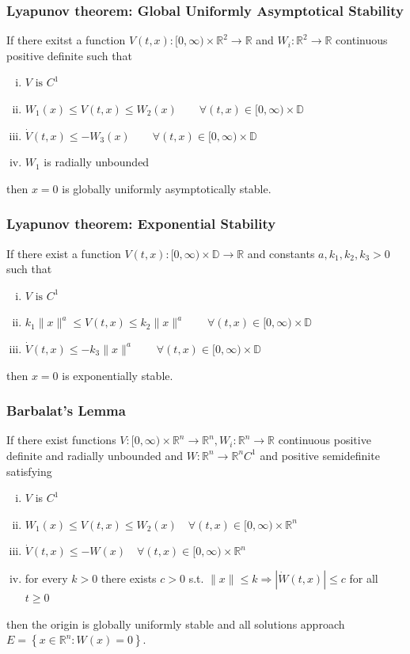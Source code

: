 \documentclass{article}
\newcommand{\mathbbR}{\mathbb{R}}
\begin{document}
\subsubsection{Lyapunov theorem: Global Uniformly Asymptotical Stability}
If there exitst a function $V(t,x):[0, \infty) \times \mathbb{R}^2 \rightarrow
	\mathbbR$ and $W_i: \mathbb{R}^2 \rightarrow \mathbb{R}$ continuous positive
definite such that
\begin{enumerate}[i)]
	\item $V \text{ is } C^1$
	\item $W_1(x) \leq V(t,x) \leq W_2(x) \qquad \forall (t,x) \in [0, \infty) \times \mathbb{D}$
	\item $\dot V(t,x) \leq -W_3(x) \qquad \forall (t,x) \in [0, \infty) \times \mathbb{D}$
	\item $W_1$ is radially unbounded
\end{enumerate}
then $x=0$ is globally uniformly asymptotically stable.
\subsubsection{Lyapunov theorem: Exponential Stability}
If there exist a function $V(t,x):[0, \infty) \times \mathbb{D} \rightarrow
	\mathbbR$ and constants $a, k_1, k_2, k_3 > 0$ such that
\begin{enumerate}[i)]
	\item $V \text{ is } C^1$
	\item $k_1 \|x\|^a \leq V(t,x) \leq k_2 \|x\|^a \qquad \forall (t,x) \in [0, \infty) \times \mathbb{D}$
	\item $\dot V(t,x) \leq -k_3 \|x\|^a \qquad \forall (t,x) \in [0, \infty) \times \mathbb{D}$
\end{enumerate}
then $x=0$ is exponentially stable.
\subsubsection{Barbalat's Lemma}
If there exist functions $V:[0, \infty) \times \mathbb{R}^n \rightarrow
	\mathbb{R}^n, W_i: \mathbb{R}^n \rightarrow \mathbb{R}$ continuous positive
definite and radially unbounded and $W: \mathbb{R}^n \rightarrow \mathbb{R}^n
	C^1$ and positive semidefinite satisfying
\begin{enumerate}[i)]
	\item $V$ is $C^1$
	\item $W_1(x) \leq V(t, x) \leq W_2(x) \quad \forall(t, x) \in[0, \infty) \times \mathbb{R}^n$
	\item $\dot{V}(t, x) \leq-W(x) \quad \forall(t, x) \in[0, \infty) \times \mathbb{R}^n$
	\item for every $k>0$ there exists $c>0$ s.t. $\|x\| \leq k
		      \Longrightarrow|\dot{W}(t, x)| \leq c$ for all $t \geq 0$
\end{enumerate}
then the origin is globally uniformly stable and all solutions approach $E=\left\{x \in \mathbb{R}^n: W(x)=0\right\}$.
\end{document}
